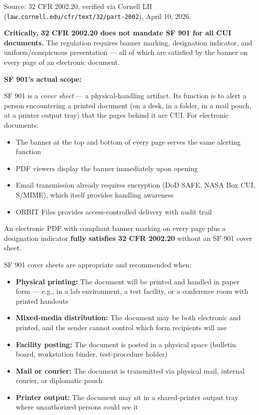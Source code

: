 {\begin{enumerate}
Source: 32 CFR 2002.20, verified via Cornell LII (\texttt{law.cornell.edu/cfr/text/32/part-2002}), April 10, 2026.

\textbf{Critically, 32 CFR 2002.20 does not mandate SF 901 for all CUI documents.} The regulation requires banner marking, designation indicator, and uniform/conspicuous presentation --- all of which are satisfied by the banner on every page of an electronic document.

\textbf{SF 901's actual scope:}

SF 901 is a \textit{cover sheet} --- a physical-handling artifact. Its function is to alert a person encountering a printed document (on a desk, in a folder, in a mail pouch, at a printer output tray) that the pages behind it are CUI. For electronic documents:

\begin{itemize}
    \item The banner at the top and bottom of every page serves the same alerting function
    \item PDF viewers display the banner immediately upon opening
    \item Email transmission already requires encryption (DoD SAFE, NASA Box CUI, S/MIME), which itself provides handling awareness
    \item ORBIT Files provides access-controlled delivery with audit trail
\end{itemize}

An electronic PDF with compliant banner marking on every page plus a designation indicator \textbf{fully satisfies 32 CFR 2002.20} without an SF 901 cover sheet.


SF 901 cover sheets are appropriate and recommended when:

\begin{itemize}
    \item \textbf{Physical printing:} The document will be printed and handled in paper form --- e.g., in a lab environment, a test facility, or a conference room with printed handouts
    \item \textbf{Mixed-media distribution:} The document may be both electronic and printed, and the sender cannot control which form recipients will use
    \item \textbf{Facility posting:} The document is posted in a physical space (bulletin board, workstation binder, test-procedure holder)
    \item \textbf{Mail or courier:} The document is transmitted via physical mail, internal courier, or diplomatic pouch
    \item \textbf{Printer output:} The document may sit in a shared-printer output tray where unauthorized persons could see it
\end{itemize}


\end{enumerate}}
